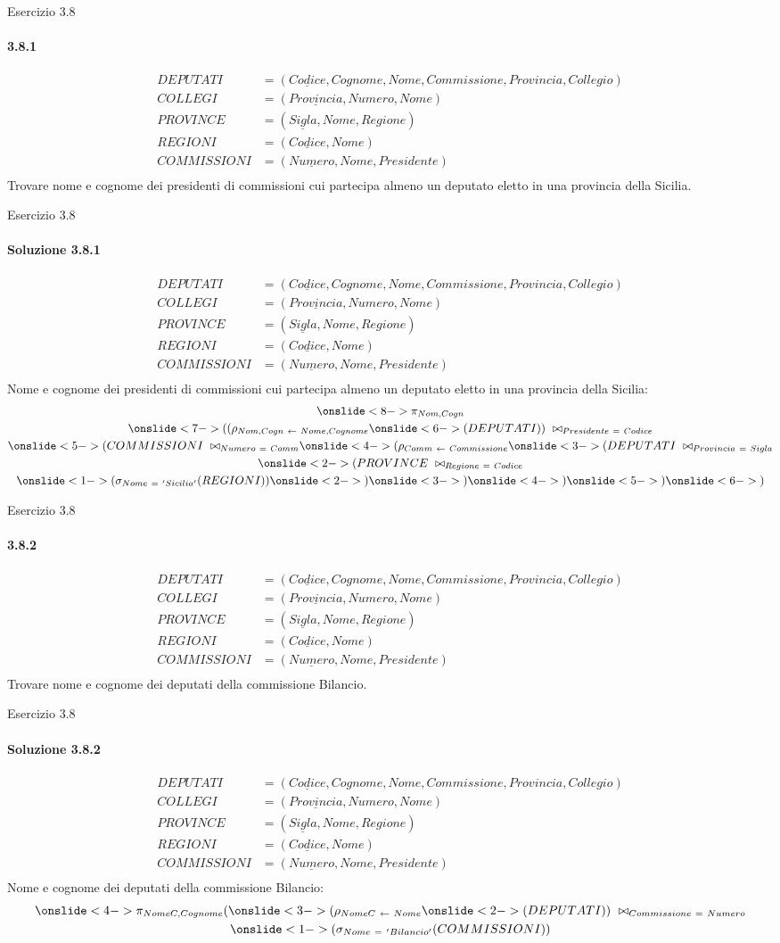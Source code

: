 \def\schemaEx3.8{\small \begin{align*}
    DEPUTATI &= (\underline{Codice}, Cognome, Nome, Commissione, Provincia, Collegio)\\
    COLLEGI &= (\underline{Provincia}, Numero,Nome)\\
    PROVINCE &= (\underline{Sigla}, Nome, Regione)\\
    REGIONI &= (\underline{Codice}, Nome)\\
    COMMISSIONI &= (\underline{Numero}, Nome, Presidente)\\
    \end{align*}}
\begin{frame}{Esercizio 3.8}
    \framesubtitle{3.8.1}
    \schemaEx3.8
    Trovare nome e cognome dei presidenti di commissioni cui partecipa almeno un deputato eletto in una provincia della Sicilia.
\end{frame}
%
\begin{frame}{Esercizio 3.8}
    \framesubtitle{Soluzione 3.8.1}
    \vspace*{-1.2cm}
    \schemaEx3.8
    {\small Nome e cognome dei presidenti di commissioni cui partecipa almeno un deputato eletto in una provincia della Sicilia:}
    \small
    \begin{gather*}
        \onslide<8->{\pi_{Nom,Cogn}}\\
        \onslide<7->{((\rho_{Nom,Cogn~\leftarrow~Nome,Cognome}}
        \onslide<6->{(DEPUTATI))~\bowtie_{Presidente~=~Codice}}\\
        \onslide<5->{(COMMISSIONI~\bowtie_{Numero~=~Comm}}
        \onslide<4->{(\rho_{Comm~\leftarrow~{Commissione}}}
        \onslide<3->{(DEPUTATI~\bowtie_{Provincia~=~Sigla}}\\
        \onslide<2->{(PROVINCE~\bowtie_{Regione~=~Codice}}\\
        \onslide<1->{(\sigma_{Nome~=~'Sicilia'}(REGIONI))}
        \onslide<2->{)}
        \onslide<3->{)}
        \onslide<4->{)}
        \onslide<5->{)}
        \onslide<6->{)}
    \end{gather*}
\end{frame}
%
\begin{frame}{Esercizio 3.8}
    \framesubtitle{3.8.2}
    \schemaEx3.8
    Trovare nome e cognome dei deputati della commissione Bilancio.
\end{frame}
%
\begin{frame}{Esercizio 3.8}
    \framesubtitle{Soluzione 3.8.2}
    \vspace*{-1.2cm}
    \schemaEx3.8
    {\small Nome e cognome dei deputati della commissione Bilancio:}
    \small
    \begin{gather*}
        \onslide<4->{\pi_{NomeC,Cognome}(}
        \onslide<3->{(\rho_{NomeC~\leftarrow~Nome}}
        \onslide<2->{(DEPUTATI))~\bowtie_{Commissione~=~Numero}}\\
        \onslide<1->{(\sigma_{Nome~=~'Bilancio'}(COMMISSIONI))}
    \end{gather*}
\end{frame}
